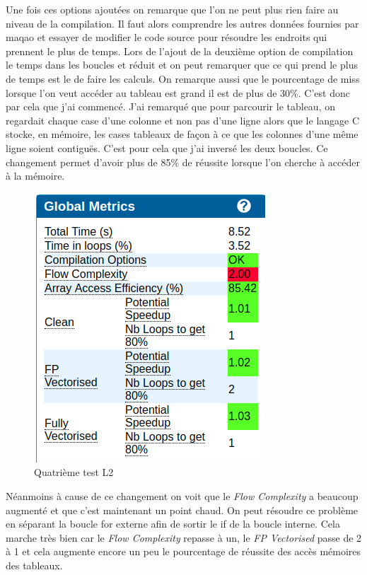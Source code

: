\documentclass[12pt,a4paper]{article}
\begin{document}
Une fois ces options ajoutées on remarque que l'on ne peut plus rien faire
au niveau de la compilation. Il faut alors comprendre les autres données 
fournies par maqao et essayer de modifier le code source pour résoudre les 
endroits qui prennent le plus de temps.
Lors de l'ajout de la deuxième option de compilation le temps dans les 
boucles et réduit et on peut remarquer que ce qui prend le plus de temps 
est le de faire les calculs. On remarque aussi que le pourcentage de miss 
lorsque l'on veut accéder au tableau est grand il est de plus de 30\%. 
C'est donc par cela que j'ai commencé. J'ai remarqué que pour parcourir le 
tableau, on regardait chaque case d'une colonne et non pas d'une ligne 
alors que le langage C stocke, en mémoire, les cases tableaux de façon à 
ce que les colonnes d'une même ligne soient contiguës. C'est pour cela 
que j'ai inversé les deux boucles. Ce changement permet d'avoir plus de 85\%
de réussite lorsque l'on cherche à accéder à la mémoire.

\begin{figure}[ht]
    \includegraphics[scale=0.6]{figures/L2/L2T4.png}
    \caption{Quatrième test L2 }
\end{figure}

Néanmoins à cause de ce changement on voit que le \textit{Flow Complexity} 
a beaucoup augmenté et que c'est maintenant un point chaud. On peut résoudre 
ce problème en séparant la boucle for externe afin de sortir le if de la 
boucle interne. Cela marche très bien car le \textit{Flow Complexity} 
repasse à un, le \textit{FP Vectorised} passe de 2 à 1 et cela augmente 
encore un peu le pourcentage de réussite des accès mémoires des tableaux.
\end{document}
